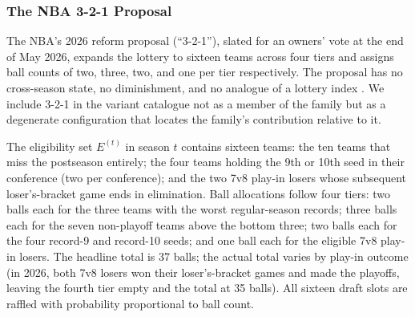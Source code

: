 
\subsubsection{The NBA 3-2-1 Proposal}
\label{sec:cola-tank321}

The NBA's 2026 reform proposal (``3-2-1''), slated for an owners' vote at the end of May 2026, expands the lottery to sixteen teams across four tiers and assigns ball counts of two, three, two, and one per tier respectively. The proposal has no cross-season state, no diminishment, and no analogue of a lottery index \citep{highley2026threetwoone}. We include 3-2-1 in the variant catalogue not as a member of the \cola{} family but as a degenerate configuration that locates the \cola{} family's contribution relative to it.

\begin{definition}
\label{def:tank321}
The eligibility set $E^{(t)}$ in season $t$ contains sixteen teams: the ten teams that miss the postseason entirely; the four teams holding the 9th or 10th seed in their conference (two per conference); and the two 7v8 play-in losers whose subsequent loser's-bracket game ends in elimination. Ball allocations follow four tiers: two balls each for the three teams with the worst regular-season records; three balls each for the seven non-playoff teams above the bottom three; two balls each for the four record-9 and record-10 seeds; and one ball each for the eligible 7v8 play-in losers. The headline total is 37 balls; the actual total varies by play-in outcome (in 2026, both 7v8 losers won their loser's-bracket games and made the playoffs, leaving the fourth tier empty and the total at 35 balls). All sixteen draft slots are raffled with probability proportional to ball count.
\end{definition}

